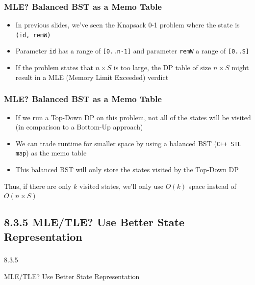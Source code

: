 \documentclass{beamer}
\begin{document}
\begin{frame}[fragile]
\frametitle{MLE? Balanced BST as a Memo Table}

\begin{itemize}
    \item In previous slides, we've seen the Knapsack 0-1 problem where the state is \verb|(id, remW)|
    \item Parameter \verb|id| has a range of \verb|[0..n-1]| and parameter \verb|remW| a range of \verb|[0..S]|
    \item If the problem states that $n \times S$ is too large, the DP table of size $n\times S$ might result in a MLE (Memory Limit Exceeded) verdict
    
\end{itemize}

\end{frame}

\begin{frame}[fragile]
\frametitle{MLE? Balanced BST as a Memo Table}

\begin{itemize}
    \item If we run a Top-Down DP on this problem, not all of the states will be visited (in comparison to a Bottom-Up approach)
    \item We can trade runtime for smaller space by using a balanced BST (\verb|C++ STL map|) as the memo table
    \item This balanced BST will only store the states visited by the Top-Down DP
\end{itemize}

\vspace{0.3cm}

\color{blue}Thus, if there are only $k$ visited states, we'll only use $O(k)$ space instead of $O(n \times S)$\color{black}

\end{frame}

\subsection{8.3.5 MLE/TLE? Use Better State Representation}

\begin{frame}
\frametitle{}
\color{blue}
\centerline{\Large{8.3.5}}
\vspace{0.3cm} 
\centerline{\Large{MLE/TLE? Use Better State Representation}}
\color{black}
\end{frame}
\end{document}
